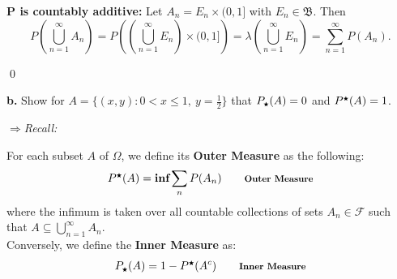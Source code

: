 \begin{proofline}
\begin{proofline}
    \textbf{$\boldsymbol{P}$ is countably additive:} 
    Let $A_n = E_n \times (0,1]$ with $E_n \in \mathfrak{B}$. Then
    \vspace{-1ex}
    \[
        P\left( \bigcup_{n=1}^{\infty} A_n \right) = P\left( \left( \bigcup_{n=1}^{\infty} E_n \right) \times (0,1] \right) = 
        \lambda\left( \bigcup_{n=1}^{\infty} E_n \right) = 
        \sum_{n=1}^{\infty} P(A_n).
    \]
    \end{proofline}

    \hfill\qed
\end{proofline}

\newpage

\textbf{b.} Show for \(A = \{(x, y) : 0 < x \leq 1,\ y = \frac{1}{2}\}\)
that \(P_{\medstar}(A) = 0\) and \(P^{\medstar}(A) = 1\).

\(\Rightarrow\)\textit{Recall:}
\vspace{-0.5ex}

\begin{mdframed}
For each subset $A$ of $\Omega$, we define its \textbf{Outer Measure} as the following:
     \vspace{-2ex}
    \[
        P^{\medstar}(A)=\textbf{inf}\sum_n P(A_n) \quad \quad \scalebox{0.8}[0.8]{\textbf{Outer Measure}}
    \]
    where the infimum is taken over all countable collections of sets $A_n \in \mathcal{F}$ such that $A \subseteq \bigcup_{n=1}^{\infty} A_n$.\\[5pt]
    Conversely, we define the \textbf{Inner Measure} as:
    \vspace{-2ex}
    \[
       P_{\medstar}(A)=1- P^{\medstar}(A^c) \quad \quad \scalebox{0.8}[0.8]{\textbf{Inner Measure}}
    \]
\end{mdframed}

